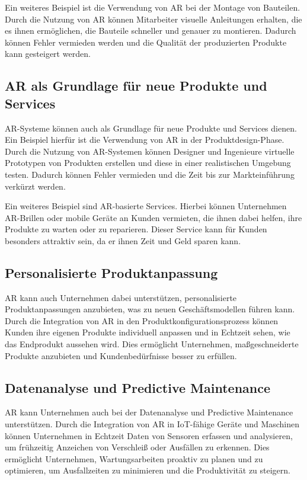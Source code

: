 Ein weiteres Beispiel ist die Verwendung von AR bei der Montage von Bauteilen.
Durch die Nutzung von AR können Mitarbeiter visuelle Anleitungen erhalten, die
es ihnen ermöglichen, die Bauteile schneller und genauer zu montieren. Dadurch
können Fehler vermieden werden und die Qualität der produzierten Produkte kann
gesteigert werden.

\subsection{AR als Grundlage für neue Produkte und Services}
AR-Systeme können auch als Grundlage für neue Produkte und Services dienen. Ein
Beispiel hierfür ist die Verwendung von AR in der Produktdesign-Phase. Durch
die Nutzung von AR-Systemen können Designer und Ingenieure virtuelle Prototypen
von Produkten erstellen und diese in einer realistischen Umgebung testen.
Dadurch können Fehler vermieden und die Zeit bis zur Markteinführung verkürzt
werden.

Ein weiteres Beispiel sind AR-basierte Services. Hierbei können Unternehmen
AR-Brillen oder mobile Geräte an Kunden vermieten, die ihnen dabei helfen, ihre
Produkte zu warten oder zu reparieren. Dieser Service kann für Kunden besonders
attraktiv sein, da er ihnen Zeit und Geld sparen kann.

\subsection{Personalisierte Produktanpassung}
AR kann auch Unternehmen dabei unterstützen, personalisierte Produktanpassungen
anzubieten, was zu neuen Geschäftsmodellen führen kann. Durch die Integration
von AR in den Produktkonfigurationsprozess können Kunden ihre eigenen Produkte
individuell anpassen und in Echtzeit sehen, wie das Endprodukt aussehen wird.
Dies ermöglicht Unternehmen, maßgeschneiderte Produkte anzubieten und
Kundenbedürfnisse besser zu erfüllen.

\subsection{Datenanalyse und Predictive Maintenance}
AR kann Unternehmen auch bei der Datenanalyse und Predictive Maintenance
unterstützen. Durch die Integration von AR in IoT-fähige Geräte und Maschinen
können Unternehmen in Echtzeit Daten von Sensoren erfassen und analysieren, um
frühzeitig Anzeichen von Verschleiß oder Ausfällen zu erkennen. Dies ermöglicht
Unternehmen, Wartungsarbeiten proaktiv zu planen und zu optimieren, um
Ausfallzeiten zu minimieren und die Produktivität zu steigern.